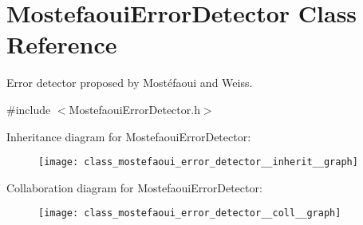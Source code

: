 \hypertarget{class_mostefaoui_error_detector}{}\section{Mostefaoui\+Error\+Detector Class Reference}
\label{class_mostefaoui_error_detector}


Error detector proposed by Mostéfaoui and Weiss.  




{\ttfamily \#include $<$Mostefaoui\+Error\+Detector.\+h$>$}



Inheritance diagram for Mostefaoui\+Error\+Detector\+:\nopagebreak
\begin{figure}[H]
\begin{center}
\leavevmode
\texttt{[image: class\_mostefaoui\_error\_detector\_\_inherit\_\_graph]}
\end{center}
\end{figure}


Collaboration diagram for Mostefaoui\+Error\+Detector\+:\nopagebreak
\begin{figure}[H]
\begin{center}
\leavevmode
\texttt{[image: class\_mostefaoui\_error\_detector\_\_coll\_\_graph]}
\end{center}
\end{figure}
